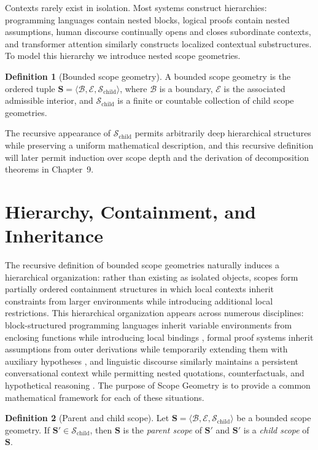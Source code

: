 \documentclass[11pt,twoside,openright]{book}
\numberwithin{equation}{chapter}
\theoremstyle{definition}
\newtheorem{definition}{Definition}[chapter]
\theoremstyle{plain}
\theoremstyle{remark}
\theoremstyle{definition}
\newcommand{\Scope}{\mathbf{S}}
\newcommand{\Boundary}{\mathcal{B}}
\newcommand{\Interior}{\mathcal{E}}
\newcommand{\Children}{\mathcal{S}_{\mathrm{child}}}
\begin{document}
Contexts rarely exist in isolation. Most systems construct hierarchies:
programming languages contain nested blocks, logical proofs contain
nested assumptions, human discourse continually opens and closes
subordinate contexts, and transformer attention similarly constructs
localized contextual substructures. To model this hierarchy we introduce
nested scope geometries.

\begin{definition}[Bounded scope geometry]
\label{def:scope-geometry}
A bounded scope geometry is the ordered tuple
$\Scope=\langle\Boundary,\Interior,\Children\rangle$, where $\Boundary$ is a
boundary, $\Interior$ is the associated admissible interior, and $\Children$
is a finite or countable collection of child scope geometries.
\end{definition}

The recursive appearance of $\Children$ permits arbitrarily deep
hierarchical structures while preserving a uniform mathematical
description, and this recursive definition will later permit induction
over scope depth and the derivation of decomposition theorems in
Chapter~9.

\section{Hierarchy, Containment, and Inheritance}

The recursive definition of bounded scope geometries naturally induces a
hierarchical organization: rather than existing as isolated objects,
scopes form partially ordered containment structures in which local
contexts inherit constraints from larger environments while introducing
additional local restrictions. This hierarchical organization appears
across numerous disciplines: block-structured programming languages
inherit variable environments from enclosing functions while introducing
local bindings \cite{Pierce2002}, formal proof systems inherit
assumptions from outer derivations while temporarily extending them with
auxiliary hypotheses \cite{Gentzen1935}, and linguistic discourse
similarly maintains a persistent conversational context while permitting
nested quotations, counterfactuals, and hypothetical reasoning
\cite{Lyons1977,Saussure1916}. The purpose of Scope Geometry is to provide
a common mathematical framework for each of these situations.

\begin{definition}[Parent and child scope]
Let $\Scope=\langle\Boundary,\Interior,\Children\rangle$ be a bounded scope
geometry. If $\Scope'\in\Children$, then $\Scope$ is the \emph{parent
scope} of $\Scope'$ and $\Scope'$ is a \emph{child scope} of $\Scope$.
\end{definition}
\end{document}
